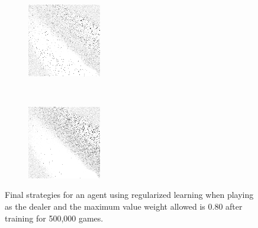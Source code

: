 \begin{figure}
\begin{subfigure}[t]{0.22\textwidth}
		\caption{\peggingmaxavggained}
	\end{subfigure}
~
	\begin{subfigure}[t]{0.22\textwidth}
		\center
		\includegraphics[width=\textwidth]{images/findings/experiments/regularization/strats/0.80/pegging_max_med_gained.png}
		\caption{\peggingmaxmedgained}
	\end{subfigure}
	~
	\begin{subfigure}[t]{0.22\textwidth}
		\center
		\includegraphics[width=\textwidth]{images/findings/experiments/regularization/strats/0.80/pegging_min_avg_given.png}
		\caption{\peggingminavggiven}
	\end{subfigure}

\caption{
	Final strategies for an agent using regularized learning
	when playing as the dealer
	and the maximum value weight allowed is 0.80
	after training for 500,000 games.
}
\label{fig:neighbor-strats}
\end{figure}
